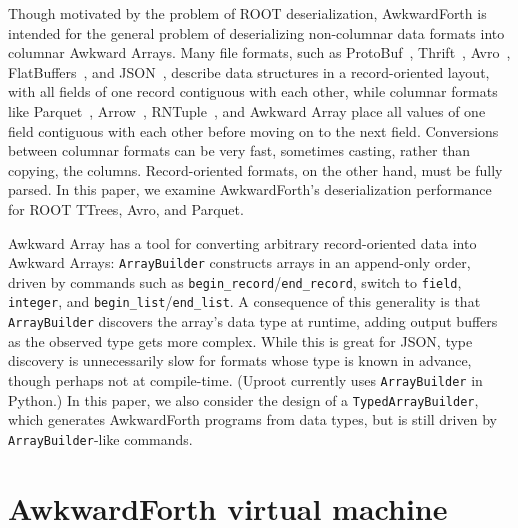 \documentclass{webofc}
\begin{document}
Though motivated by the problem of ROOT deserialization, AwkwardForth is intended for the general problem of deserializing non-columnar data formats into columnar Awkward Arrays. Many file formats, such as ProtoBuf~\cite{protobuf}, Thrift~\cite{thrift}, Avro~\cite{avro}, FlatBuffers~\cite{flatbuffers}, and JSON~\cite{json}, describe data structures in a record-oriented layout, with all fields of one record contiguous with each other, while columnar formats like Parquet~\cite{parquet}, Arrow~\cite{arrow}, RNTuple~\cite{rntuple}, and Awkward Array place all values of one field contiguous with each other before moving on to the next field. Conversions between columnar formats can be very fast, sometimes casting, rather than copying, the columns. Record-oriented formats, on the other hand, must be fully parsed. In this paper, we examine AwkwardForth's deserialization performance for ROOT TTrees, Avro, and Parquet.

Awkward Array has a tool for converting arbitrary record-oriented data into Awkward Arrays: \texttt{ArrayBuilder} constructs arrays in an append-only order, driven by commands such as \texttt{begin_record}/\texttt{end_record}, switch to \texttt{field}, \texttt{integer}, and \texttt{begin_list}/\texttt{end_list}. A consequence of this generality is that \texttt{ArrayBuilder} discovers the array's data type at runtime, adding output buffers as the observed type gets more complex. While this is great for JSON, type discovery is unnecessarily slow for formats whose type is known in advance, though perhaps not at compile-time. (Uproot currently uses \texttt{ArrayBuilder} in Python.) In this paper, we also consider the design of a \texttt{TypedArrayBuilder}, which generates AwkwardForth programs from data types, but is still driven by \texttt{ArrayBuilder}-like commands.

\section{AwkwardForth virtual machine}
\end{document}

